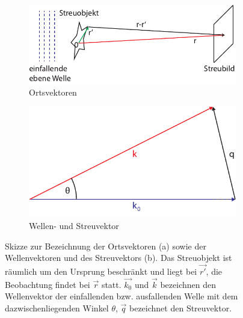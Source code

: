 \begin{figure}
	\centering
	\begin{subfigure}[b]{0.49\textwidth}
		\includegraphics[width=\textwidth]{images/bornr.pdf}
		\caption{Ortsvektoren}
		\label{fig:bornr}
	\end{subfigure}
	\begin{subfigure}[b]{0.49\textwidth}
		\includegraphics[width=\textwidth]{images/bornq.pdf}
		\caption{Wellen- und Streuvektor}
		\label{fig:bornq}
	\end{subfigure}
	\caption[Geometrie bei Born Näherung]{Skizze zur Bezeichnung der Ortsvektoren (a) sowie
		 der Wellenvektoren und des Streuvektors (b). Das Streuobjekt ist räumlich um den Ursprung beschränkt und liegt bei $\vec{r'}$, die Beobachtung findet bei $\vec{r}$ statt. $\vec{k_{0}}$ und $\vec{k}$ bezeichnen den Wellenvektor der einfallenden bzw. ausfallenden Welle mit dem dazwischenliegenden Winkel $\theta$, $\vec{q}$ bezeichnet den Streuvektor.}
\end{figure} 


